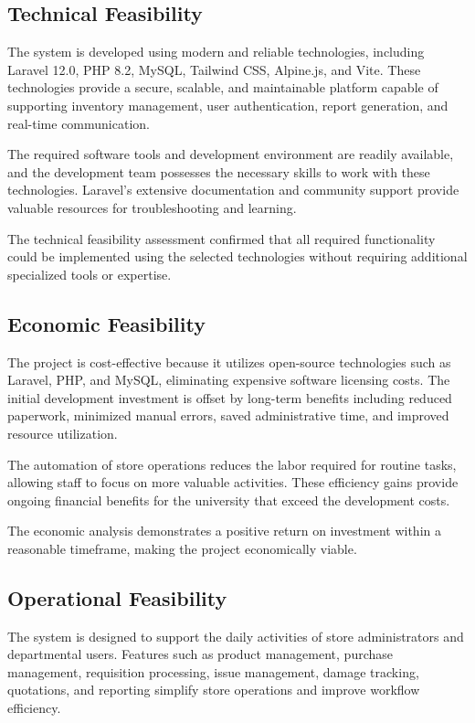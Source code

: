 \subsection{Technical Feasibility}

The system is developed using modern and reliable technologies, including Laravel 12.0, PHP 8.2, MySQL, Tailwind CSS, Alpine.js, and Vite. These technologies provide a secure, scalable, and maintainable platform capable of supporting inventory management, user authentication, report generation, and real-time communication.

The required software tools and development environment are readily available, and the development team possesses the necessary skills to work with these technologies. Laravel's extensive documentation and community support provide valuable resources for troubleshooting and learning.

The technical feasibility assessment confirmed that all required functionality could be implemented using the selected technologies without requiring additional specialized tools or expertise.

\subsection{Economic Feasibility}

The project is cost-effective because it utilizes open-source technologies such as Laravel, PHP, and MySQL, eliminating expensive software licensing costs. The initial development investment is offset by long-term benefits including reduced paperwork, minimized manual errors, saved administrative time, and improved resource utilization.

The automation of store operations reduces the labor required for routine tasks, allowing staff to focus on more valuable activities. These efficiency gains provide ongoing financial benefits for the university that exceed the development costs.

The economic analysis demonstrates a positive return on investment within a reasonable timeframe, making the project economically viable.

\subsection{Operational Feasibility}

The system is designed to support the daily activities of store administrators and departmental users. Features such as product management, purchase management, requisition processing, issue management, damage tracking, quotations, and reporting simplify store operations and improve workflow efficiency.

